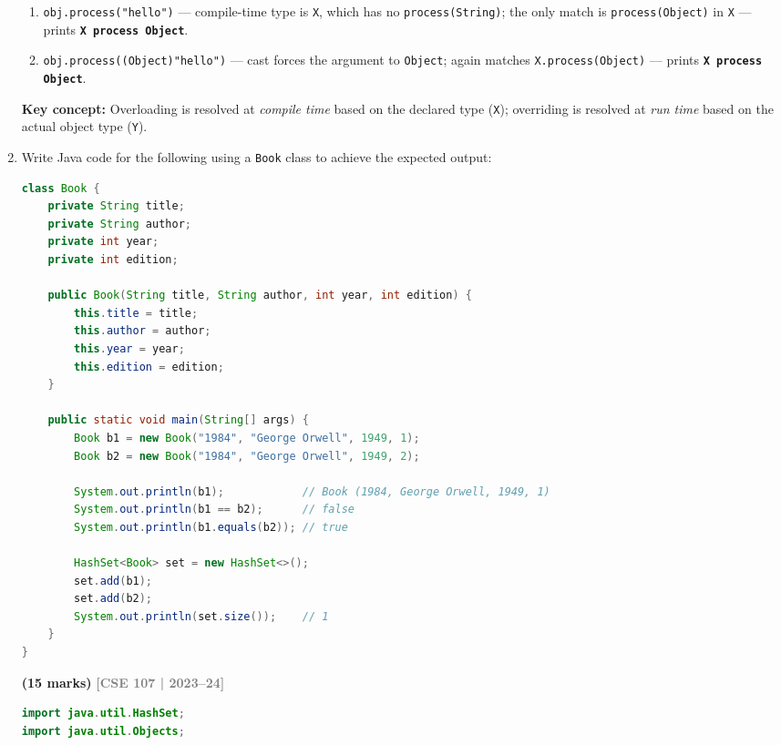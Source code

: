 \documentclass[12pt,a3paper]{article}
\newcommand{\yr}[1]{\hfill\textcolor{gray}{\small\textbf{[#1]}}}
\newcommand{\mk}[1]{\textcolor{orange!70!black}{\small\textbf{(#1 marks)}}}
\begin{document}
\begin{enumerate}
\begin{tcolorbox}
\begin{enumerate}[label=\textbf{\arabic*.}, itemsep=3pt]
  \item \texttt{obj.process("hello")} --- compile-time type is \texttt{X},
  which has no \texttt{process(String)}; the only match is
  \texttt{process(Object)} in \texttt{X} --- prints
  \textbf{\texttt{X process Object}}.

  \item \texttt{obj.process((Object)"hello")} --- cast forces the
  argument to \texttt{Object}; again matches \texttt{X.process(Object)}
  --- prints \textbf{\texttt{X process Object}}.
\end{enumerate}

\textbf{Key concept:} Overloading is resolved at \emph{compile time}
based on the declared type (\texttt{X}); overriding is resolved at
\emph{run time} based on the actual object type (\texttt{Y}).
\end{tcolorbox}

\item Write Java code for the following using a \texttt{Book} class to achieve the expected output:
\begin{lstlisting}[language=Java]
class Book {
    private String title;
    private String author;
    private int year;
    private int edition;

    public Book(String title, String author, int year, int edition) {
        this.title = title;
        this.author = author;
        this.year = year;
        this.edition = edition;
    }

    public static void main(String[] args) {
        Book b1 = new Book("1984", "George Orwell", 1949, 1);
        Book b2 = new Book("1984", "George Orwell", 1949, 2);
        
        System.out.println(b1);            // Book (1984, George Orwell, 1949, 1)
        System.out.println(b1 == b2);      // false
        System.out.println(b1.equals(b2)); // true
        
        HashSet<Book> set = new HashSet<>();
        set.add(b1);
        set.add(b2);
        System.out.println(set.size());    // 1
    }
}
\end{lstlisting}
\mk{15}
\yr{CSE 107 | 2023--24}

\begin{tcolorbox}[enhanced,breakable,ansbox,
  colback=cC!4,colframe=cC,boxrule=0.8pt,arc=5pt,
  title={\textbf{Answer --- Book Class: toString, equals, hashCode}},
  fonttitle=\bfseries\color{white},colbacktitle=cC]
\begin{lstlisting}[language=Java]
import java.util.HashSet;
import java.util.Objects;


\end{lstlisting}
\end{tcolorbox}
\end{enumerate}
\end{document}
